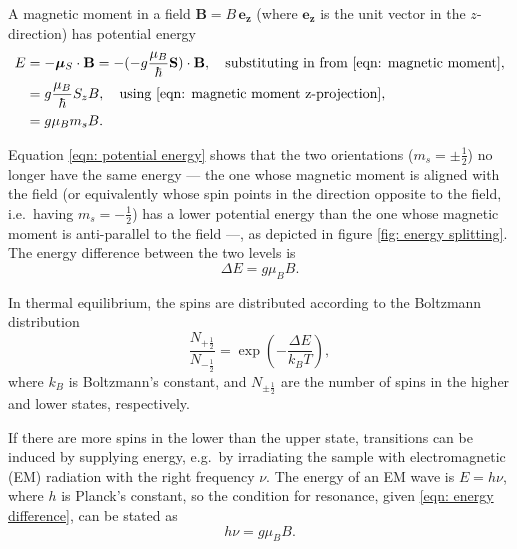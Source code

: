 \documentclass[a4paper]{jpconf}
\numberwithin{equation}{section}
\begin{document}
A magnetic moment in a field $\mathbf{B} = B \, \mathbf{e_z}$ (where $\mathbf{e_z}$ is the unit vector in the $z$-direction) has potential energy
\begin{align}
	E &= - \bm{\mu}_S \cdot \mathbf{B} = - (- g \frac{\mu_B}{\hbar} \mathbf{S})\cdot\mathbf{B}, \quad \text{substituting in from \eqref{eqn: magnetic moment}}, \nonumber \\
	  &= g \frac{\mu_B}{\hbar}S_z B, \quad \text{using \eqref{eqn: magnetic moment z-projection}}, \nonumber \\
	  &= g\mu_Bm_sB \label{eqn: potential energy}.
\end{align}

Equation \eqref{eqn: potential energy} shows that the two orientations ($m_s = \pm\tfrac12$) no longer have the same energy --- the one whose magnetic moment is aligned with the field (or equivalently whose spin points in the direction opposite to the field, i.e.\ having $m_s = -\tfrac12$) has a lower potential energy than the one whose magnetic moment is anti-parallel to the field ---, as depicted in figure \ref{fig: energy splitting}. The energy difference between the two levels is 
\begin{equation}
	\Delta E = g \mu_B B. \label{eqn: energy difference}
\end{equation}

In thermal equilibrium, the spins are distributed according to the Boltzmann distribution
\[
    \frac{N_{+\tfrac12}}{N_{-\tfrac12}} = \exp(- \frac{\Delta E}{k_B T}),
\]
where $k_B$ is Boltzmann\textquoteright s constant, and $N_{\pm\tfrac12}$ are the number of spins in the higher and lower states, respectively. 

If there are more spins in the lower than the upper state, transitions can be induced by supplying energy, e.g.\ by irradiating the sample with electromagnetic (EM) radiation with the right frequency $\nu$. The energy of an EM wave is $E = h \nu$, where $h$ is Planck's constant, so the condition for resonance, given \eqref{eqn: energy difference}, can be stated as
\begin{equation}
	h\nu = g\mu_B B. \label{eqn: resonance condition}
\end{equation}
\end{document}
